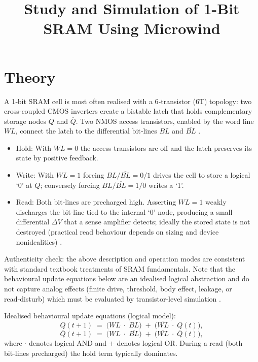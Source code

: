 \documentclass[12pt]{article}
\title{Study and Simulation of 1-Bit SRAM Using Microwind}
\author{}
\date{}
\begin{document}


\pagebreak

\tableofcontents

\pagebreak
{}
\maketitle

\section*{Theory}
A 1‑bit SRAM cell is most often realised with a 6‑transistor (6T) topology: two cross‑coupled CMOS inverters create a bistable latch that holds complementary storage nodes \(Q\) and \(\overline{Q}\). Two NMOS access transistors, enabled by the word line \(WL\), connect the latch to the differential bit‑lines \(BL\) and \(\overline{BL}\) \cite{WesteHarris, Rabaey}.

\begin{itemize}
  \item Hold: With \(WL=0\) the access transistors are off and the latch preserves its state by positive feedback.
  \item Write: With \(WL=1\) forcing \(BL/\overline{BL}=0/1\) drives the cell to store a logical ‘0’ at \(Q\); conversely forcing \(BL/\overline{BL}=1/0\) writes a ‘1’.
  \item Read: Both bit‑lines are precharged high. Asserting \(WL=1\) weakly discharges the bit‑line tied to the internal ‘0’ node, producing a small differential \(\Delta V\) that a sense amplifier detects; ideally the stored state is not destroyed (practical read behaviour depends on sizing and device nonidealities) \cite{CalhounChandrakasan}.
\end{itemize}

Authenticity check: the above description and operation modes are consistent with standard textbook treatments of SRAM fundamentals. Note that the behavioural update equations below are an idealised logical abstraction and do not capture analog effects (finite drive, threshold, body effect, leakage, or read‑disturb) which must be evaluated by transistor‑level simulation \cite{WesteHarris, Rabaey}.

Idealised behavioural update equations (logical model):
\[
  Q(t+1) \;=\; \big(WL\;\cdot\;BL\big) \;+\; \big(\overline{WL}\;\cdot\;Q(t)\big),
\]
\[
  \overline{Q}(t+1) \;=\; \big(WL\;\cdot\;\overline{BL}\big) \;+\; \big(\overline{WL}\;\cdot\;\overline{Q}(t)\big),
\]
where \(\cdot\) denotes logical AND and \(+\) denotes logical OR. During a read (both bit‑lines precharged) the hold term typically dominates.
\end{document}
